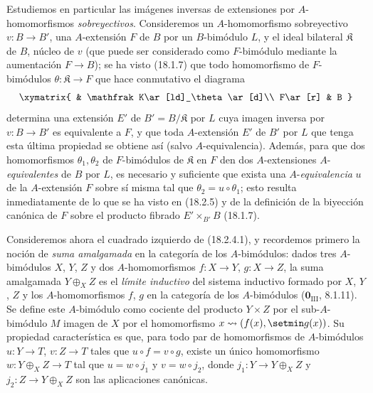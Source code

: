 \begin{env}[18.2.6]
\label{0.18.2.6-es}
Estudiemos en particular las imágenes inversas de extensiones por
$A$-homomorfismos \emph{sobreyectivos}. Consideremos un $A$-homomorfismo
sobreyectivo $v:B\to B'$, una $A$-extensión $F$ de $B$ por un $B$-bimódulo $L$,
y el ideal bilateral $\mathfrak K$ de $B$, núcleo de $v$ (que puede ser
considerado como $F$-bimódulo mediante la aumentación $F\to B$); se ha visto
(18.1.7) que todo homomorfismo de $F$-bimódulos
$\theta:\mathfrak K\to F$ que hace conmutativo el diagrama
\[
  \xymatrix{
    & \mathfrak K\ar[ld]_\theta\ar[d]\\
    F\ar[r] & B
  }
\]
determina una extensión $E'$ de $B'=B/\mathfrak K$ por $L$ cuya imagen
inversa por $v:B\to B'$ es equivalente a $F$, y que toda $A$-extensión
$E'$ de $B'$ por $L$ que tenga esta última propiedad se obtiene así (salvo
$A$-equivalencia). Además, para que dos homomorfismos
$\theta_1,\theta_2$ de $F$-bimódulos de $\mathfrak K$ en $F$ den dos
  $A$-extensiones $A$-\emph{equivalentes} de $B$ por $L$, es necesario y suficiente que
exista una $A$-\emph{equivalencia} $u$ de la $A$-extensión $F$ sobre sí misma tal que
$\theta_2=u\circ\theta_1$; esto resulta inmediatamente de lo que se ha visto en
(18.2.5) y de la definición de la biyección canónica de $F$ sobre el producto
fibrado $E'\times_{B'}B$ (18.1.7).
\end{env}

\begin{env}[18.2.7]
\label{0.18.2.7-es}
Consideremos ahora el cuadrado izquierdo de (18.2.4.1), y recordemos primero
la noción de \emph{suma amalgamada} en la categoría de los $A$-bimódulos:
dados tres $A$-bimódulos $X$, $Y$, $Z$ y dos $A$-homomorfismos
$f:X\to Y$, $g:X\to Z$, la suma amalgamada $Y\oplus_XZ$ es el \emph{límite
inductivo} del sistema inductivo formado por $X$, $Y$, $Z$ y los
$A$-homomorfismos $f$, $g$ en la categoría de los $A$-bimódulos
($\mathbf{0}_{\mathrm{III}}$, 8.1.11). Se define este $A$-bimódulo como cociente del
producto $Y\times Z$ por el sub-$A$-bimódulo $M$ imagen de $X$ por
el homomorfismo $x\leadsto(f(x),\setmin g(x))$. Su propiedad característica es que,
para todo par de homomorfismos de $A$-bimódulos $u:Y\to T$, $v:Z\to T$
tales que $u\circ f=v\circ g$, existe un único homomorfismo
$w:Y\oplus_XZ\to T$ tal que $u=w\circ j_1$ y $v=w\circ j_2$, donde
$j_1:Y\to Y\oplus_XZ$ y $j_2:Z\to Y\oplus_XZ$ son las aplicaciones
canónicas.
\end{env}

